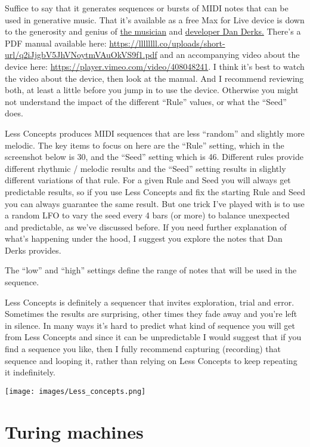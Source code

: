 \documentclass[
  12pt,
  letterpaper,
  oneside,
  open=any]{scrbook}
\begin{document}
Suffice to say that it generates sequences or bursts of MIDI notes that
can be used in generative music. That it's available as a free Max for
Live device is down to the generosity and genius of
\href{https://dndrks.bandcamp.com}{the musician} and
\href{https://github.com/dndrks}{developer Dan Derks.} There's a PDF
manual available here:
\url{https://llllllll.co/uploads/short-url/q2iJjgbV5JhVNoytmVAuOkVS9f1.pdf}
and an accompanying video about the device here:
\url{https://player.vimeo.com/video/408048241}. I think it's best to
watch the video about the device, then look at the manual. And I
recommend reviewing both, at least a little before you jump in to use
the device. Otherwise you might not understand the impact of the
different ``Rule'' values, or what the ``Seed'' does.

Less Concepts produces MIDI sequences that are less ``random'' and
slightly more melodic. The key items to focus on here are the ``Rule''
setting, which in the screenshot below is 30, and the ``Seed'' setting
which is 46. Different rules provide different rhythmic / melodic
results and the ``Seed'' setting results in slightly different
variations of that rule. For a given Rule and Seed you will always get
predictable results, so if you use Less Concepts and fix the starting
Rule and Seed you can always guarantee the same result. But one trick
I've played with is to use a random LFO to vary the seed every 4 bars
(or more) to balance unexpected and predictable, as we've discussed
before. If you need further explanation of what's happening under the
hood, I suggest you explore the notes that Dan Derks provides.

The ``low'' and ``high'' settings define the range of notes that will be
used in the sequence.

Less Concepts is definitely a sequencer that invites exploration, trial
and error. Sometimes the results are surprising, other times they fade
away and you're left in silence. In many ways it's hard to predict what
kind of sequence you will get from Less Concepts and since it can be
unpredictable I would suggest that if you find a sequence you like, then
I fully recommend capturing (recording) that sequence and looping it,
rather than relying on Less Concepts to keep repeating it indefinitely.

\texttt{[image: images/Less\_concepts.png]}

\section{Turing machines}\label{turing-machines}
\end{document}
